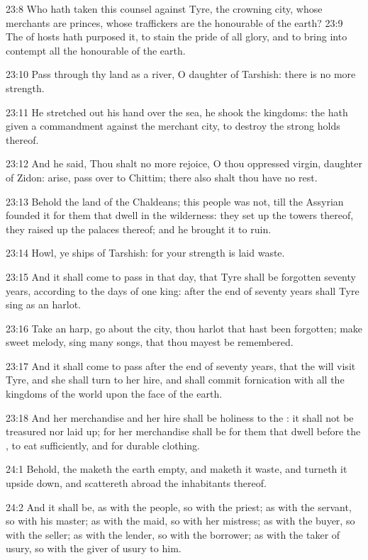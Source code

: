 23:8 Who hath taken this counsel against Tyre, the crowning city,
whose merchants are princes, whose traffickers are the honourable of
the earth?  23:9 The \LORD of hosts hath purposed it, to stain the
pride of all glory, and to bring into contempt all the honourable of
the earth.

23:10 Pass through thy land as a river, O daughter of Tarshish: there
is no more strength.

23:11 He stretched out his hand over the sea, he shook the kingdoms:
the \LORD hath given a commandment against the merchant city, to
destroy the strong holds thereof.

23:12 And he said, Thou shalt no more rejoice, O thou oppressed
virgin, daughter of Zidon: arise, pass over to Chittim; there also
shalt thou have no rest.

23:13 Behold the land of the Chaldeans; this people was not, till the
Assyrian founded it for them that dwell in the wilderness: they set up
the towers thereof, they raised up the palaces thereof; and he brought
it to ruin.

23:14 Howl, ye ships of Tarshish: for your strength is laid waste.

23:15 And it shall come to pass in that day, that Tyre shall be
forgotten seventy years, according to the days of one king: after the
end of seventy years shall Tyre sing as an harlot.

23:16 Take an harp, go about the city, thou harlot that hast been
forgotten; make sweet melody, sing many songs, that thou mayest be
remembered.

23:17 And it shall come to pass after the end of seventy years, that
the \LORD will visit Tyre, and she shall turn to her hire, and shall
commit fornication with all the kingdoms of the world upon the face of
the earth.

23:18 And her merchandise and her hire shall be holiness to the \LORD:
it shall not be treasured nor laid up; for her merchandise shall be
for them that dwell before the \LORD, to eat sufficiently, and for
durable clothing.

24:1 Behold, the \LORD maketh the earth empty, and maketh it waste, and
turneth it upside down, and scattereth abroad the inhabitants thereof.

24:2 And it shall be, as with the people, so with the priest; as with
the servant, so with his master; as with the maid, so with her
mistress; as with the buyer, so with the seller; as with the lender,
so with the borrower; as with the taker of usury, so with the giver of
usury to him.

